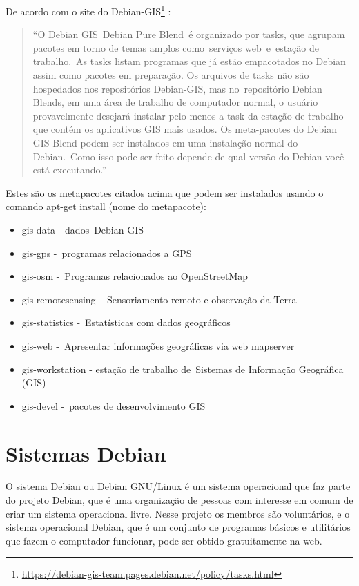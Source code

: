 De acordo com o site do Debian-GIS\footnote{\url{https://debian-gis-team.pages.debian.net/policy/tasks.html}} \cite{bib:gis}:

\begin{quote}
	``O Debian GIS Debian Pure Blend é organizado por tasks, que agrupam pacotes em torno de temas amplos como serviços web e estação de trabalho. As tasks listam programas que já estão empacotados no Debian assim como pacotes em preparação. Os arquivos de tasks não são hospedados nos repositórios Debian-GIS, mas no repositório Debian Blends, em uma área de trabalho de computador normal, o usuário provavelmente desejará instalar pelo menos a task da estação de trabalho que contém os aplicativos GIS mais usados. Os meta-pacotes do Debian GIS Blend podem ser instalados em uma instalação normal do Debian. Como isso pode ser feito depende de qual versão do Debian você está executando.''  
\end{quote}

Estes são os metapacotes citados acima que podem ser instalados usando o comando apt-get install (nome do metapacote):

\begin{itemize}
	\item gis-data - dados Debian GIS
	\item gis-gps - programas relacionados a GPS
	\item gis-osm - Programas relacionados ao OpenStreetMap
	\item gis-remotesensing - Sensoriamento remoto e observação da Terra
	\item gis-statistics - Estatísticas com dados geográficos
	\item gis-web - Apresentar informações geográficas via web mapserver
	\item gis-workstation - estação de trabalho de Sistemas de Informação Geográfica (GIS)
	\item gis-devel - pacotes de desenvolvimento GIS

\end{itemize}

\section{Sistemas Debian}
O sistema Debian ou Debian GNU/Linux é um sistema operacional que faz parte do projeto Debian, que é uma organização de pessoas com interesse em comum de criar um sistema operacional livre. Nesse projeto os membros são voluntários, e o sistema operacional Debian, que é um conjunto de programas básicos e utilitários que fazem o computador funcionar, pode ser obtido gratuitamente na web.

